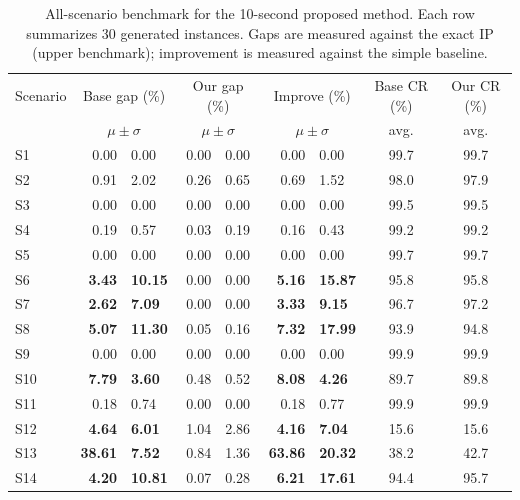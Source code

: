 \documentclass[10pt,a4paper]{article}
\begin{document}
\begin{table}[htbp]
\centering
\small
\setlength{\tabcolsep}{3pt}
\caption{All-scenario benchmark for the 10-second proposed method.  Each row summarizes 30 generated instances.  Gaps are measured against the exact IP (upper benchmark); improvement is measured against the simple baseline.}
\label{tab:bench_all}
\begin{tabular}{l r@{\;$\pm$\;}l r@{\;$\pm$\;}l r@{\;$\pm$\;}l |cc}
\toprule
Scenario & 
\multicolumn{2}{c}{Base gap (\%)} & 
\multicolumn{2}{c}{Our gap (\%)} & 
\multicolumn{2}{c|}{Improve (\%)} & 
Base CR (\%) & Our CR (\%)\\
& 
\multicolumn{2}{c}{$\mu \pm \sigma$} & 
\multicolumn{2}{c}{$\mu \pm \sigma$} & 
\multicolumn{2}{c|}{$\mu \pm \sigma$} & 
avg. & avg.\\
\midrule
S1  &  0.00 & 0.00 & 0.00 & 0.00 &  0.00 & 0.00 & 99.7 & 99.7\\
S2  &  0.91 & 2.02 & 0.26 & 0.65 &  0.69 & 1.52 & 98.0 & 97.9\\
S3  &  0.00 & 0.00 & 0.00 & 0.00 &  0.00 & 0.00 & 99.5 & 99.5\\
S4  &  0.19 & 0.57 & 0.03 & 0.19 &  0.16 & 0.43 & 99.2 & 99.2\\
S5  &  0.00 & 0.00 & 0.00 & 0.00 &  0.00 & 0.00 & 99.7 & 99.7\\
S6  & \textbf{3.43} & \textbf{10.15} & 0.00 & 0.00 & \textbf{5.16} & \textbf{15.87} & 95.8 & 95.8\\
S7  & \textbf{2.62} & \textbf{7.09} & 0.00 & 0.00 & \textbf{3.33} & \textbf{9.15} & 96.7 & 97.2\\
S8  & \textbf{5.07} & \textbf{11.30} & 0.05 & 0.16 & \textbf{7.32} & \textbf{17.99} & 93.9 & 94.8\\
S9  &  0.00 & 0.00 & 0.00 & 0.00 &  0.00 & 0.00 & 99.9 & 99.9\\
S10 & \textbf{7.79} & \textbf{3.60} & 0.48 & 0.52 & \textbf{8.08} & \textbf{4.26} & 89.7 & 89.8\\
S11 &  0.18 & 0.74 & 0.00 & 0.00 &  0.18 & 0.77 & 99.9 & 99.9\\
S12 & \textbf{4.64} & \textbf{6.01} & 1.04 & 2.86 & \textbf{4.16} & \textbf{7.04} & 15.6 & 15.6\\
S13 & \textbf{38.61} & \textbf{7.52} & 0.84 & 1.36 & \textbf{63.86} & \textbf{20.32} & 38.2 & 42.7\\
S14 & \textbf{4.20} & \textbf{10.81} & 0.07 & 0.28 & \textbf{6.21} & \textbf{17.61} & 94.4 & 95.7\\
\bottomrule
\end{tabular}
\end{table}
\end{document}
